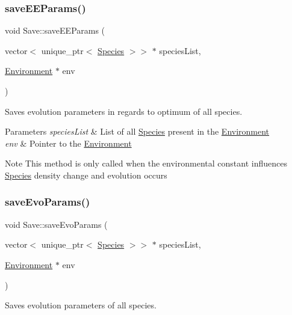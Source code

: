 \subsubsection{\texorpdfstring{save\+E\+E\+Params()}{saveEEParams()}}
{\footnotesize\ttfamily void Save\+::save\+E\+E\+Params (\begin{DoxyParamCaption}\item[{vector$<$ unique\+\_\+ptr$<$ \hyperlink{classSpecies}{Species} $>$$>$ $\ast$}]{species\+List,  }\item[{\hyperlink{classEnvironment}{Environment} $\ast$}]{env }\end{DoxyParamCaption})}



Saves evolution parameters in regards to optimum of all species. 


\begin{DoxyParams}{Parameters}
{\em species\+List} & List of all \hyperlink{classSpecies}{Species} present in the \hyperlink{classEnvironment}{Environment} \\
\hline
{\em env} & Pointer to the \hyperlink{classEnvironment}{Environment}\\
\hline
\end{DoxyParams}
\begin{DoxyNote}{Note}
This method is only called when the environmental constant influences \hyperlink{classSpecies}{Species} density change and evolution occurs 
\end{DoxyNote}
\mbox{\label{classSave_a793a85379317ce9e5a08f7155a990fa8}} 
\subsubsection{\texorpdfstring{save\+Evo\+Params()}{saveEvoParams()}}
{\footnotesize\ttfamily void Save\+::save\+Evo\+Params (\begin{DoxyParamCaption}\item[{vector$<$ unique\+\_\+ptr$<$ \hyperlink{classSpecies}{Species} $>$$>$ $\ast$}]{species\+List,  }\item[{\hyperlink{classEnvironment}{Environment} $\ast$}]{env }\end{DoxyParamCaption})}



Saves evolution parameters of all species. 


